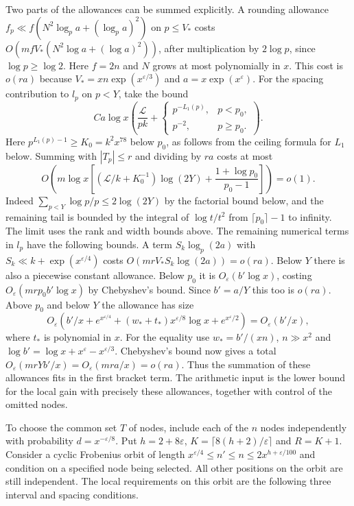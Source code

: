 \documentclass[11pt]{amsart}
\theoremstyle{definition}
\theoremstyle{remark}
\begin{document}
Two parts of the allowances can be summed explicitly. A rounding
allowance $f_p\ll f(N^2\log_p a+(\log_p a)^2)$ on
$p\le V_*$ costs
$O(m f V_*(N^2\log a+(\log a)^2))$, after multiplication by
$2\log p$, since $\log p\ge\log2$. Here $f=2n$ and $N$ grows
at most polynomially in $x$. This cost is $o(ra)$ because
$V_*=xn\exp(x^{\varepsilon/3})$ and $a=x\exp(x^\varepsilon)$.
For the spacing contribution to $l_p$ on $p<Y$, take the bound
\[
 C a\log x\left(\frac{\mathcal L}{pk}
 +\begin{cases}p^{-L_1(p)},&p<p_0,\\ p^{-2},&p\ge p_0.\end{cases}\right).
\]
Here $p^{L_1(p)-1}\ge K_0=k^2x^{78}$ below $p_0$, as follows
from the ceiling formula for $L_1$ below. Summing with
$|T_p|\le r$ and dividing by $ra$ costs at most
\[
 O\!\left(m\log x\left[
 (\mathcal L/k+K_0^{-1})\log(2Y)
 +\frac{1+\log p_0}{p_0-1}\right]\right)=o(1).
\]
Indeed $\sum_{p<Y}\log p/p\le2\log(2Y)$ by the factorial
bound below, and the remaining tail is bounded by the integral
of $\log t/t^2$ from $\lceil p_0\rceil-1$ to infinity.
The limit uses the rank and width bounds above. The remaining numerical terms in $l_p$ have the following
bounds. A term $S_k\log_p(2a)$ with
$S_k\ll k+\exp(x^{\varepsilon/4})$ costs
$O(mrV_*S_k\log(2a))=o(ra)$. Below $Y$ there is also a
piecewise constant allowance. Below $p_0$ it is
$O_\varepsilon(b'\log x)$, costing $O_\varepsilon(mr p_0 b'\log x)$
by Chebyshev's bound. Since $b'=a/Y$ this too is $o(ra)$.
Above $p_0$ and below $Y$ the allowance has size
\[
 O_\varepsilon\!\left(b'/x+e^{x^{\varepsilon/4}}
  +(w_*+t_*)x^{\varepsilon/8}\log x+e^{x^\varepsilon/2}\right)
 =O_\varepsilon(b'/x),
\]
where $t_*$ is polynomial in $x$. For the equality use
$w_*=b'/(xn)$, $n\gg x^2$ and
$\log b'=\log x+x^\varepsilon-x^{\varepsilon/3}$.
Chebyshev's bound now gives a total $O_\varepsilon(mrYb'/x)
=O_\varepsilon(mra/x)=o(ra)$. Thus the summation of these
allowances fits in the first bracket term. The arithmetic input
is the lower bound for the local gain with precisely these
allowances, together with control of the omitted nodes.

To choose the common set $T$ of nodes, include each of the $n$
nodes independently with probability $d=x^{-\varepsilon/8}$. Put
$h=2+8\varepsilon$, $K=\lceil8(h+2)/\varepsilon\rceil$ and
$R=K+1$. Consider a cyclic Frobenius orbit of length
$x^{\varepsilon/4}\le n'\le n\le 2x^{h+\varepsilon/100}$ and
condition on a specified node being selected. All other positions
on the orbit are still independent. The local requirements on this
orbit are the following three interval and spacing conditions.
\end{document}
